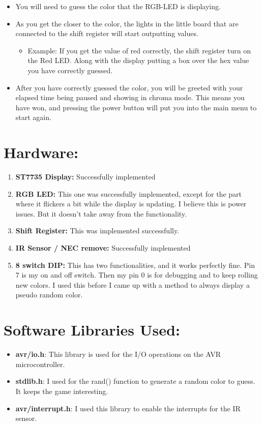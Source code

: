 \documentclass[12pt]{article}
\begin{document}
\begin{itemize}
\pagebreak
  \item You will need to guess the color that the RGB-LED is displaying.
  \item As you get the closer to the color, the lights in the little board
    that are connected to the shift register will start outputting values.
    \begin{itemize}
      \item Example: If you get the value of red correctly,
        the shift register turn on the Red LED.
        Along with the display putting a box over the hex value you have correctly guessed.
    \end{itemize}
  \item After you have correctly guessed the color, you will be greeted with your
    elapsed time being paused and showing in chroma mode.
    This means you have won, and pressing
    the power button will put you into the main menu to start again.
\end{itemize}

\pagebreak
\section{Hardware:}
\begin{enumerate}
  \item \textbf{ST7735 Display:}
    Successfully implemented
  \item \textbf{RGB LED:}
    This one was successfully implemented, except for the part
    where it flickers a bit while the display is updating.
    I believe this is power issues. But it doesn't take away
    from the functionality.
  \item \textbf{Shift Register:} This was implemented successfully.
  \item \textbf{IR Sensor / NEC remove:}
    Successfully implemented
  \item \textbf{8 switch DIP:}
    This has two functionalities, and it works perfectly fine. Pin 7 is my on and off switch.
    Then my pin 0 is for debugging and to keep rolling new colors. I used this before I came up
    with a method to always display a pseudo random color.
\end{enumerate}

\pagebreak




\pagebreak
\section{Software Libraries Used:}
\begin{itemize}
  \item \textbf{avr/io.h}:
    This library is used for the I/O operations on the AVR microcontroller.
  \item \textbf{stdlib.h}:
    I used for the rand() function to generate a random color to guess.
    It keeps the game interesting.
  \item \textbf{avr/interrupt.h}:
    I used this library to enable the interrupts for the IR sensor.
\end{itemize}
\end{document}
